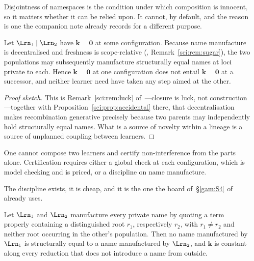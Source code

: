 Disjointness of namespaces is the condition under which composition is innocent, so it matters
whether it can be relied upon. It cannot, by default, and the reason is one the companion note
already records for a different purpose.

\begin{proposition}\label{com:prop:unstable}
Let $\Lrn_1 \mid \Lrn_2$ have $\mathbf{k} = \mathbf{0}$ at some configuration. Because name
manufacture is decentralised and freshness is scope-relative (\chSci, Remark~\ref{sci:rem:sugar}), the two
populations may subsequently manufacture structurally equal names at loci private to each. Hence
$\mathbf{k} = \mathbf{0}$ at one configuration does not entail $\mathbf{k} = \mathbf{0}$ at a
successor, and neither learner need have taken any step aimed at the other.
\end{proposition}

\begin{proof}[Proof sketch]
This is Remark~\ref{sci:rem:luck} of~\chSci---closure is luck, not construction---together with
Proposition~\ref{sci:prop:accidental} there, that decentralisation makes recombination generative precisely because two
parents may independently hold structurally equal names. What is a source of novelty within a
lineage is a source of unplanned coupling between learners.
\end{proof}

\begin{corollary}\label{com:there-no-modular-composition}
One cannot compose two learners and certify non-interference from the parts alone. Certification
requires either a global check at each configuration, which is model checking and is priced, or a
discipline on name manufacture.
\end{corollary}

The discipline exists, it is cheap, and it is the one the board of~\S\ref{gam:S4} of \chGame already uses.

\begin{proposition}\label{com:prop:root}
Let $\Lrn_1$ and $\Lrn_2$ manufacture every private name by quoting a term properly containing a
distinguished root $r_1$, respectively $r_2$, with $r_1 \neq r_2$ and neither root occurring in
the other's population. Then no name manufactured by $\Lrn_1$ is structurally equal to a name
manufactured by $\Lrn_2$, and $\mathbf{k}$ is constant along every reduction that does not
introduce a name from outside.
\end{proposition}

